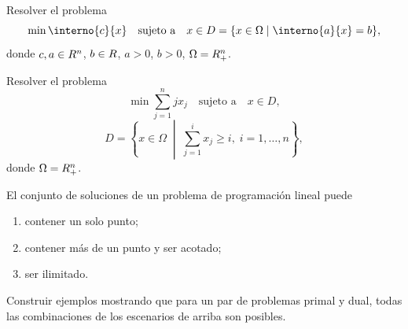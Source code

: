 \begin{exercise}\label{v2:ejer:6.1.8}
    Resolver el problema
    \[
        \min \interno{c}{x} \quad \text{sujeto a} \quad x \in D = \{ x \in \Omega \mid \interno{a}{x} = b \},
    \]
    donde $c, a \in R^n$, $b \in R$, $a > 0$, $b > 0$, $\Omega = R^n_+$.
\end{exercise}

\begin{exercise}\label{v2:ejer:6.1.9}
    Resolver el problema
    \[
        \min \sum_{j=1}^n j x_j \quad \text{sujeto a} \quad x \in D,
    \]
    \[
        D = \left\{ x \in \Omega \;\middle|\; \sum_{j=1}^i x_j \ge i, \; i = 1, \dots, n \right\},
    \]
    donde $\Omega = R^n_+$.
\end{exercise}

\begin{exercise}\label{v2:ejer:6.1.10}
    El conjunto de soluciones de un problema de programación lineal puede
    \begin{enumerate}[label=(\alph*)]
        \item contener un solo punto;
        \item contener más de un punto y ser acotado;
        \item ser ilimitado.
    \end{enumerate}
    Construir ejemplos mostrando que para un par de problemas primal y dual, todas las combinaciones de los escenarios de arriba son posibles.
\end{exercise}